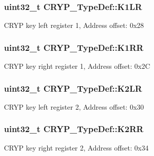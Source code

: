 \subsubsection[{\texorpdfstring{K1\+LR}{K1LR}}]{ uint32\+\_\+t C\+R\+Y\+P\+\_\+\+Type\+Def\+::\+K1\+LR}\hypertarget{struct_c_r_y_p___type_def_a816fc42432d8064efbf944430e45050d}{}\label{struct_c_r_y_p___type_def_a816fc42432d8064efbf944430e45050d}
C\+R\+YP key left register 1, Address offset\+: 0x28 
\subsubsection[{\texorpdfstring{K1\+RR}{K1RR}}]{ uint32\+\_\+t C\+R\+Y\+P\+\_\+\+Type\+Def\+::\+K1\+RR}\hypertarget{struct_c_r_y_p___type_def_a496e0b1dee706ce76274ae74ee4e8095}{}\label{struct_c_r_y_p___type_def_a496e0b1dee706ce76274ae74ee4e8095}
C\+R\+YP key right register 1, Address offset\+: 0x2C 
\subsubsection[{\texorpdfstring{K2\+LR}{K2LR}}]{ uint32\+\_\+t C\+R\+Y\+P\+\_\+\+Type\+Def\+::\+K2\+LR}\hypertarget{struct_c_r_y_p___type_def_aa0dc0e8f97e7b7333083c1429c41bca8}{}\label{struct_c_r_y_p___type_def_aa0dc0e8f97e7b7333083c1429c41bca8}
C\+R\+YP key left register 2, Address offset\+: 0x30 
\subsubsection[{\texorpdfstring{K2\+RR}{K2RR}}]{ uint32\+\_\+t C\+R\+Y\+P\+\_\+\+Type\+Def\+::\+K2\+RR}\hypertarget{struct_c_r_y_p___type_def_a96ef270d5244bd331fb8db5b0deffb4a}{}\label{struct_c_r_y_p___type_def_a96ef270d5244bd331fb8db5b0deffb4a}
C\+R\+YP key right register 2, Address offset\+: 0x34 
